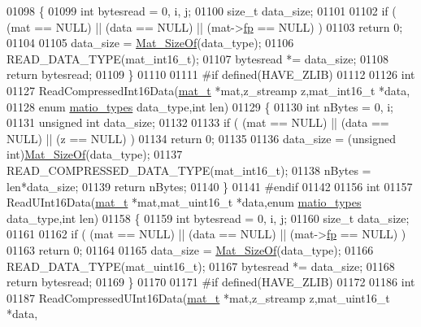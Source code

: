 \begin{DoxyCode}
01098 \{
01099     \textcolor{keywordtype}{int} bytesread = 0, i, j;
01100     \textcolor{keywordtype}{size\_t} data\_size;
01101 
01102     \textcolor{keywordflow}{if} ( (mat == NULL) || (data == NULL) || (mat->\hyperlink{struct__mat__t_a85f562e407ca9ad4d2a6e14f839432b7}{fp} == NULL) )
01103         \textcolor{keywordflow}{return} 0;
01104 
01105     data\_size = \hyperlink{group__mat__util_gab6774aabdc124c540c1e7686d0804940}{Mat\_SizeOf}(data\_type);
01106     READ\_DATA\_TYPE(mat\_int16\_t);
01107     bytesread *= data\_size;
01108     \textcolor{keywordflow}{return} bytesread;
01109 \}
01110 
01111 \textcolor{preprocessor}{#if defined(HAVE\_ZLIB)}
01112 
01126 \textcolor{keywordtype}{int}
01127 ReadCompressedInt16Data(\hyperlink{struct__mat__t}{mat\_t} *mat,z\_streamp z,mat\_int16\_t *data,
01128     \textcolor{keyword}{enum} \hyperlink{group___m_a_t_gacf7b3b879282b7ab3a51190e49bf3453}{matio\_types} data\_type,\textcolor{keywordtype}{int} len)
01129 \{
01130     \textcolor{keywordtype}{int} nBytes = 0, i;
01131     \textcolor{keywordtype}{unsigned} \textcolor{keywordtype}{int} data\_size;
01132 
01133     \textcolor{keywordflow}{if} ( (mat == NULL) || (data == NULL) || (z == NULL) )
01134         \textcolor{keywordflow}{return} 0;
01135 
01136     data\_size = (\textcolor{keywordtype}{unsigned} int)\hyperlink{group__mat__util_gab6774aabdc124c540c1e7686d0804940}{Mat\_SizeOf}(data\_type);
01137     READ\_COMPRESSED\_DATA\_TYPE(mat\_int16\_t);
01138     nBytes = len*data\_size;
01139     \textcolor{keywordflow}{return} nBytes;
01140 \}
01141 \textcolor{preprocessor}{#endif}
01142 
01156 \textcolor{keywordtype}{int}
01157 ReadUInt16Data(\hyperlink{struct__mat__t}{mat\_t} *mat,mat\_uint16\_t *data,\textcolor{keyword}{enum} \hyperlink{group___m_a_t_gacf7b3b879282b7ab3a51190e49bf3453}{matio\_types} data\_type,\textcolor{keywordtype}{int} len)
01158 \{
01159     \textcolor{keywordtype}{int} bytesread = 0, i, j;
01160     \textcolor{keywordtype}{size\_t} data\_size;
01161 
01162     \textcolor{keywordflow}{if} ( (mat == NULL) || (data == NULL) || (mat->\hyperlink{struct__mat__t_a85f562e407ca9ad4d2a6e14f839432b7}{fp} == NULL) )
01163         \textcolor{keywordflow}{return} 0;
01164 
01165     data\_size = \hyperlink{group__mat__util_gab6774aabdc124c540c1e7686d0804940}{Mat\_SizeOf}(data\_type);
01166     READ\_DATA\_TYPE(mat\_uint16\_t);
01167     bytesread *= data\_size;
01168     \textcolor{keywordflow}{return} bytesread;
01169 \}
01170 
01171 \textcolor{preprocessor}{#if defined(HAVE\_ZLIB)}
01172 
01186 \textcolor{keywordtype}{int}
01187 ReadCompressedUInt16Data(\hyperlink{struct__mat__t}{mat\_t} *mat,z\_streamp z,mat\_uint16\_t *data,

\end{DoxyCode}

